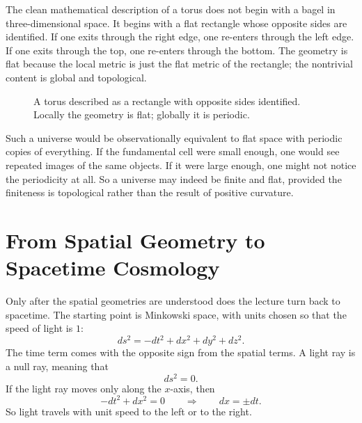 The clean mathematical description of a torus does not begin with a bagel in three-dimensional space. It begins with a flat rectangle whose opposite sides are identified. If one exits through the right edge, one re-enters through the left edge. If one exits through the top, one re-enters through the bottom. The geometry is flat because the local metric is just the flat metric of the rectangle; the nontrivial content is global and topological.

\begin{figure}[htbp]
\centering
{}
\caption{A torus described as a rectangle with opposite sides identified. Locally the geometry is flat; globally it is periodic.}
\end{figure}

Such a universe would be observationally equivalent to flat space with periodic copies of everything. If the fundamental cell were small enough, one would see repeated images of the same objects. If it were large enough, one might not notice the periodicity at all. So a universe may indeed be finite and flat, provided the finiteness is topological rather than the result of positive curvature.

\section{From Spatial Geometry to Spacetime Cosmology}

Only after the spatial geometries are understood does the lecture turn back to spacetime. The starting point is Minkowski space, with units chosen so that the speed of light is \(1\):
\begin{equation}
ds^2 = -dt^2 + dx^2 + dy^2 + dz^2.
\end{equation}
The time term comes with the opposite sign from the spatial terms. A light ray is a null ray, meaning that
\begin{equation}
ds^2 = 0.
\end{equation}
If the light ray moves only along the \(x\)-axis, then
\begin{equation}
-dt^2 + dx^2 = 0
\qquad\Rightarrow\qquad
dx = \pm dt.
\end{equation}
So light travels with unit speed to the left or to the right.

